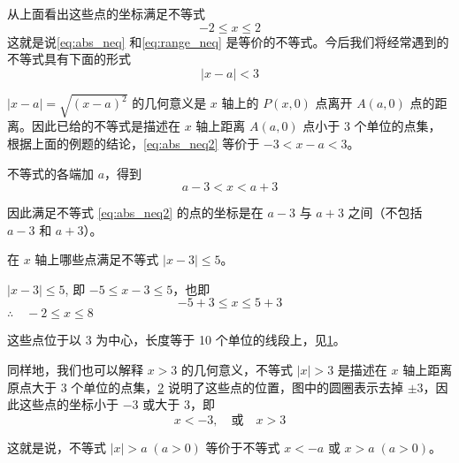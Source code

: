 从上面看出这些点的坐标满足不等式
\begin{equation}
  \label{eq:range_neq}
    -2\leqslant x\leqslant 2
\end{equation}
这就是说\cref{eq:abs_neq} 和\cref{eq:range_neq} 是等价的不等式。今后我们将经常遇到的不等式具有下面的形式
\begin{equation}
  \label{eq:abs_neq2}
    |x-a|<3
\end{equation}

$|x-a|=\sqrt{(x-a)^2}$ 的几何意义是 $x$ 轴上的 $P(x,0)$ 点离开 $A(a,0)$ 点的距离。因此已给的不等式是描述在 $x$ 轴上距离 $A(a,0)$ 点小于 3 个单位的点集，根据上面的例题的结论，\cref{eq:abs_neq2} 等价于 $-3<x-a<3$。

不等式的各端加 $a$，得到
\begin{equation}
  a-3<x<a+3    
\end{equation}

因此满足不等式 \eqref{eq:abs_neq2} 的点的坐标是在 $a-3$ 与 $a+3$ 之间（不包括 $a-3$ 和 $a+3$）。

\begin{example}
  在 $x$ 轴上哪些点满足不等式 $|x-3|\leqslant 5$。
\end{example}

\begin{solution}
  $|x-3|\leqslant 5$, 即 $-5\leqslant x-3\leqslant 5$，也即
\[-5+3\leqslant x\leqslant 5+3\]
$\therefore\quad -2\leqslant x\leqslant 8$

这些点位于以 3 为中心，长度等于 10 个单位的线段上，见\cref{fig:solution}。
\begin{figure}

    \caption{}\label{fig:solution}
\end{figure}

同样地，我们也可以解释 $x>3$ 的几何意义，不等式 $|x|>3$ 是描述在 $x$ 轴上距离原点大于 3 个单位的点集，\cref{fig:solution2} 说明了这些点的位置，图中的圆圈表示去掉 $\pm 3$，因此这些点的坐标小于 $-3$ 或大于 3，即
\[x<-3,\quad \text{或}\quad x>3\]

\begin{figure}
    \caption{}\label{fig:solution2}
\end{figure}

这就是说，不等式 $|x|>a\; (a>0)$ 等价于不等式 $x<-a$ 或 $x>a\; (a>0)$。
\end{solution}


